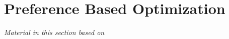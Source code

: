 \chapter{Preference Based Optimization}\label{sec:preference_optimization}

\graphicspath{{chapters/preference_optimization/figures/}}

\emph{Material in this section based on
\citet{thatte2017sample}\cite{thatte2017sample}} 
\linebreak






